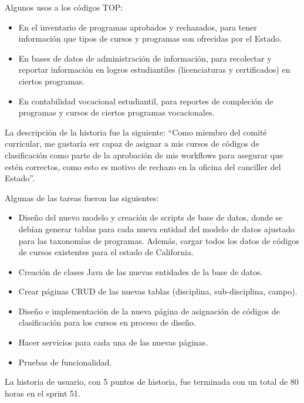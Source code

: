 Algunos usos a los códigos TOP:
\begin{itemize}
	\item En el inventario de programas aprobados y rechazados, para tener información que tipos de cursos y programas son ofrecidas por el Estado.
	\item En bases de datos de administración de información, para recolectar y reportar información en logros estudiantiles (licenciaturas y certificados) en ciertos programas.
	\item En contabilidad vocacional estudiantil, para reportes de compleción de programas y cursos de ciertos programas vocacionales.
\end{itemize}

La descripción de la historia fue la siguiente: “Como miembro del comité curricular, me gustaría ser capaz de asignar a mis cursos de códigos de clasificación como parte de la aprobación de mis workflows para asegurar que estén correctos, como esto es motivo de rechazo en la oficina del canciller del Estado”.

Algunas de las tareas fueron las siguientes:
\begin{itemize}
	\item Diseño del nuevo modelo y creación de scripts de base de datos, donde se debían generar tablas para cada nueva entidad del modelo de datos ajustado para las taxonomías de programas. Además, cargar todos los datos de códigos de cursos existentes para el estado de California.
	\item Creación de clases Java de las nuevas entidades de la base de datos.
	\item Crear páginas CRUD de las nuevas tablas (disciplina, sub-disciplina, campo).
	\item Diseño e implementación de la nueva página de asignación de códigos de clasificación para los cursos en proceso de diseño.
	\item Hacer servicios para cada una de las nuevas páginas.
	\item Pruebas de funcionalidad.
\end{itemize}

La historia de usuario, con 5 puntos de historia, fue terminada con un total de 80 horas en el sprint 51.